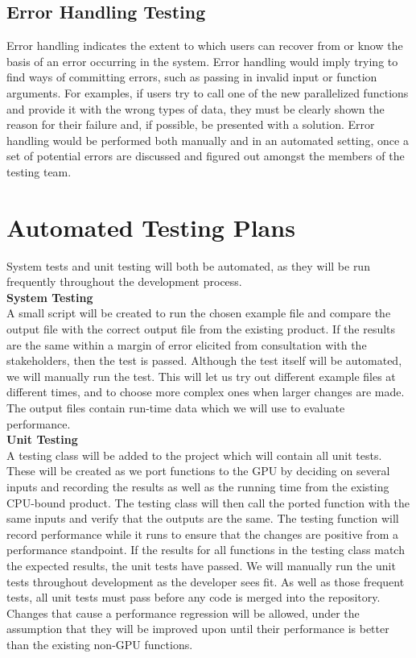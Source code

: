 \documentclass[12pt]{article}
\begin{document}
\subsection{Error Handling Testing} %
Error handling indicates the extent to which users can recover from or know the basis of an error occurring in the system. Error handling would imply trying to find ways of committing errors, such as passing in invalid input or function arguments. For examples, if users try to call one of the new parallelized functions and provide it with the wrong types of data, they must be clearly shown the reason for their failure and, if possible, be presented with a solution. Error handling would be performed both manually and in an automated setting, once a set of potential errors are discussed and figured out amongst the members of the testing team.

\section{Automated Testing Plans} %
System tests and unit testing will both be automated, as they will be run frequently throughout the development process.\\

\textbf{System Testing}\\
A small script will be created to run the chosen example file and compare the output file with the correct output file from the existing product. If the results are the same within a margin of error elicited from consultation with the stakeholders, then the test is passed. Although the test itself will be automated, we will manually run the test. This will let us try out different example files at different times, and to choose more complex ones when larger changes are made. The output files contain run-time data which we will use to evaluate performance.\\

\textbf{Unit Testing}\\

A testing class will be added to the project which will contain all unit tests. These will be created as we port functions to the GPU by deciding on several inputs and recording the results as well as the running time from the existing CPU-bound product. The testing class will then call the ported function with the same inputs and verify that the outputs are the same. The testing function will record performance while it runs to ensure that the changes are positive from a performance standpoint. If the results for all functions in the testing class match the expected results, the unit tests have passed. We will manually run the unit tests throughout development as the developer sees fit. As well as those frequent tests, all unit tests must pass before any code is merged into the repository. Changes that cause a performance regression will be allowed, under the assumption that they will be improved upon until their performance is better than the existing non-GPU functions.
\end{document}
